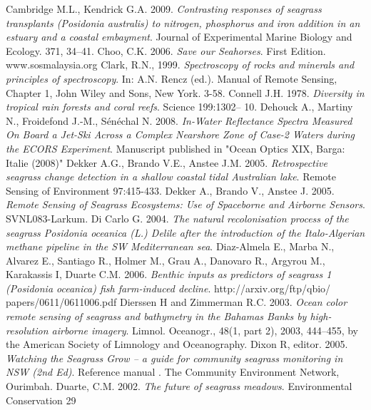 \documentclass[10pt, a4paper]{article}
\begin{document}
\begin{thebibliography}{999}
Cambridge M.L., Kendrick G.A. 2009. \emph{Contrasting responses of seagrass transplants
(Posidonia australis) to nitrogen, phosphorus and iron addition in an estuary and a coastal
embayment}. Journal of Experimental Marine Biology and Ecology. 371, 34–41. \pageref{Cambridge09}
Choo, C.K. 2006. \emph{Save our Seahorses}. First Edition. www.sosmalaysia.org \pageref{Choo06}
Clark, R.N., 1999. \emph{Spectroscopy of rocks and minerals and principles of spectroscopy}.
In: A.N. Rencz (ed.). Manual of Remote Sensing, Chapter 1, John Wiley and Sons, New
York. 3-58. \pageref{Choo06}
Connell J.H. 1978. \emph{Diversity in tropical rain forests and coral reefs}. Science 199:1302–
10. \pageref{Connell78}
Dehouck A., Martiny N., Froidefond J.-M., Sénéchal N. 2008. \emph{In-Water Reflectance
Spectra Measured On Board a Jet-Ski Across a Complex Nearshore Zone of Case-2 Waters
during the ECORS Experiment}. Manuscript published in "Ocean Optics XIX, Barga: Italie
(2008)" \pageref{Dehouck08}
Dekker A.G., Brando V.E., Anstee J.M. 2005. \emph{Retrospective seagrass change detection
in a shallow coastal tidal Australian lake}. Remote Sensing of Environment 97:415-433. \pageref{Dekker05a}
Dekker A., Brando V., Anstee J. 2005. \emph{Remote Sensing of Seagrass Ecosystems: Use of
Spaceborne and Airborne Sensors}. SVNL083-Larkum. \pageref{Dekker05b}
Di Carlo G. 2004. \emph{The natural recolonisation process of the seagrass Posidonia
oceanica (L.) Delile after the introduction of the Italo-Algerian methane pipeline in the SW
Mediterranean sea}. 
\pageref{DiCarlo04}
Diaz-Almela E., Marba N., Alvarez E., Santiago R., Holmer M., Grau A., Danovaro R.,
Argyrou M., Karakassis I, Duarte C.M. 2006. \emph{Benthic inputs as predictors of seagrass 1
(\textit{Posidonia oceanica}) fish farm-induced decline}. http://arxiv.org/ftp/qbio/
papers/0611/0611006.pdf \pageref{Diaz-Almela06}
Dierssen H and Zimmerman R.C. 2003. \emph{Ocean color remote sensing of seagrass and
bathymetry in the Bahamas Banks by high-resolution airborne imagery}. Limnol. Oceanogr.,
48(1, part 2), 2003, 444–455, by the American Society of Limnology and Oceanography. \pageref{Dierssen03}
Dixon R, editor. 2005. \emph{Watching the Seagrass Grow – a guide for community seagrass
monitoring in NSW (2nd Ed)}. Reference manual . The Community Environment Network,
Ourimbah. \pageref{Dixon05}
Duarte, C.M. 2002. \emph{The future of seagrass meadows}. Environmental Conservation 29

\end{thebibliography}
\end{document}
